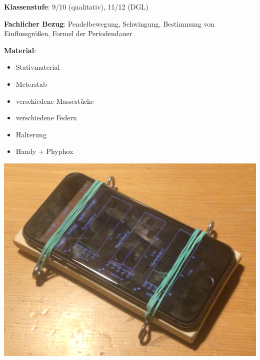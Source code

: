 \documentclass[../main.tex]{subfiles}
\begin{document}
\begin{tcolorbox}[
    width=\textwidth,
    height=\textheight,
    title=Phyphox: Federpendel,
    fonttitle=\Large,
    before title=\vspace{0.2cm}, after title=\vspace{0.2cm},
    colback=white,
    title filled=true, 
    colbacktitle=myorange,
    colframe=black,
    coltitle=black,
    ]

    \begin{minipage}[]{0.75\textwidth}
        \vspace{0.2cm}
        \textbf{Klassenstufe}: 9/10 (qualitativ), 11/12 (DGL)

        \vspace{0.5cm}

        \textbf{Fachlicher Bezug}: Pendelbewegung, Schwingung, Bestimmung von Einflussgrößen, Formel der Periodendauer


    \begin{minipage}[]{0.5\textwidth}
        \vspace{0.5cm} 
        \textbf{Material}:
        \begin{itemize}[noitemsep]
            \item Stativmaterial
            \item Meterstab
            \item verschiedene Massestücke
            \item verschiedene Federn
            \item Halterung
            \item Handy + Phyphox
        \end{itemize}
    \end{minipage}
    \hspace{0.45cm}
    \begin{minipage}[]{0.45\textwidth}
        \vspace{0.5cm}
        \includegraphics[width=\textwidth]{img/halterung2}
    \end{minipage}


\end{minipage}
\end{tcolorbox}
\end{document}
